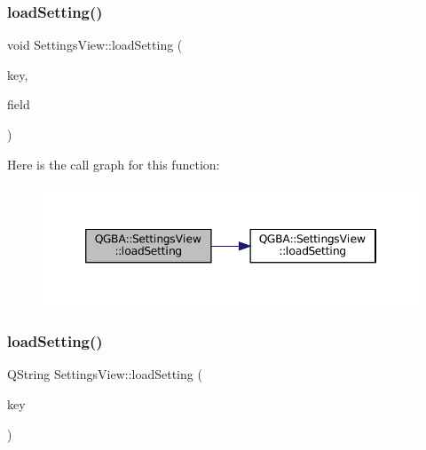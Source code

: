 \subsubsection{\texorpdfstring{load\+Setting()}{loadSetting()}\hspace{0.1cm}{\footnotesize\ttfamily [6/7]}}
{\footnotesize\ttfamily void Settings\+View\+::load\+Setting (\begin{DoxyParamCaption}\item[{const char $\ast$}]{key,  }\item[{Q\+Spin\+Box $\ast$}]{field }\end{DoxyParamCaption})\hspace{0.3cm}{\ttfamily [private]}}

Here is the call graph for this function\+:
\nopagebreak
\begin{figure}[H]
\begin{center}
\leavevmode
\includegraphics[width=346pt]{class_q_g_b_a_1_1_settings_view_ac177861b2dd7aea144a68f554f069db5_cgraph}
\end{center}
\end{figure}
\mbox{\label{class_q_g_b_a_1_1_settings_view_a40b5c189d40375908f5ff441898ea7a9}} 
\subsubsection{\texorpdfstring{load\+Setting()}{loadSetting()}\hspace{0.1cm}{\footnotesize\ttfamily [7/7]}}
{\footnotesize\ttfamily Q\+String Settings\+View\+::load\+Setting (\begin{DoxyParamCaption}\item[{const char $\ast$}]{key }\end{DoxyParamCaption})\hspace{0.3cm}{\ttfamily [private]}}


